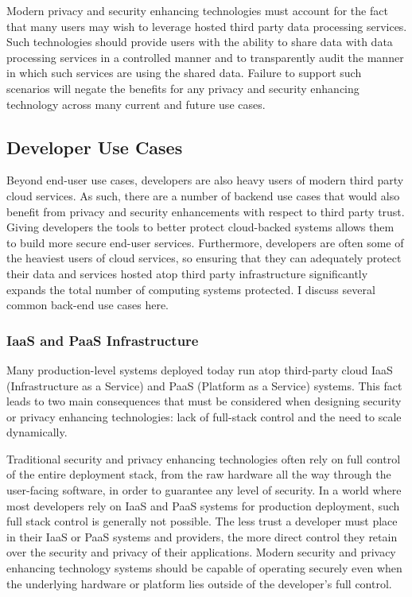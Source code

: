 Modern privacy and security enhancing technologies must account for
the fact that many users may wish to leverage hosted third party data
processing services. Such technologies should provide users with the
ability to share data with data processing services in a controlled
manner and to transparently audit the manner in which such services
are using the shared data. Failure to support such scenarios will
negate the benefits for any privacy and security enhancing technology
across many current and future use cases.

\subsection{Developer Use Cases}

Beyond end-user use cases, developers are also heavy users of modern
third party cloud services. As such, there are a number of backend use
cases that would also benefit from privacy and security enhancements
with respect to third party trust. Giving developers the tools to
better protect cloud-backed systems allows them to build more secure
end-user services. Furthermore, developers are often some of the
heaviest users of cloud services, so ensuring that they can adequately
protect their data and services hosted atop third party infrastructure
significantly expands the total number of computing systems
protected. I discuss several common back-end use cases here.

\subsubsection{IaaS and PaaS Infrastructure}

Many production-level systems deployed today run atop third-party
cloud IaaS (Infrastructure as a Service) and PaaS (Platform as a
Service) systems. This fact leads to two main consequences that must
be considered when designing security or privacy enhancing
technologies: lack of full-stack control and the need to scale
dynamically.

Traditional security and privacy enhancing technologies often rely on
full control of the entire deployment stack, from the raw hardware all
the way through the user-facing software, in order to guarantee any
level of security. In a world where most developers rely on IaaS and
PaaS systems for production deployment, such full stack control is
generally not possible. The less trust a developer must place in their
IaaS or PaaS systems and providers, the more direct control they
retain over the security and privacy of their applications. Modern
security and privacy enhancing technology systems should be capable of
operating securely even when the underlying hardware or platform lies
outside of the developer's full control.

